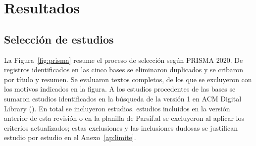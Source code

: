 \documentclass[12pt, a4paper]{article}
\begin{document}
\section{Resultados}
\label{sec:resultados}

\subsection{Selecci\'{o}n de estudios}

La Figura~\ref{fig:prisma} resume el proceso de selecci\'{o}n seg\'{u}n PRISMA 2020. De \Pidentificados{} registros identificados en las cinco bases se eliminaron \Pduplicados{} duplicados y se cribaron \Pcribados{} por t\'{i}tulo y resumen. Se evaluaron \Pevaluados{} textos completos, de los que se excluyeron \PexclTC{} con los motivos indicados en la figura. A los estudios procedentes de las bases se sumaron \POtrosIncluidos{} estudios identificados en la b\'{u}squeda de la versi\'{o}n 1 en ACM Digital Library (\IDsensibNo). En total se incluyeron \Nestudios{} estudios. \NexcluidosLimite{} estudios incluidos en la versi\'{o}n anterior de esta revisi\'{o}n o en la planilla de Parsif.al se excluyeron al aplicar los criterios actualizados; estas exclusiones y las \NincluidosLimite{} inclusiones dudosas se justifican estudio por estudio en el Anexo~\ref{ap:limite}.
\end{document}
